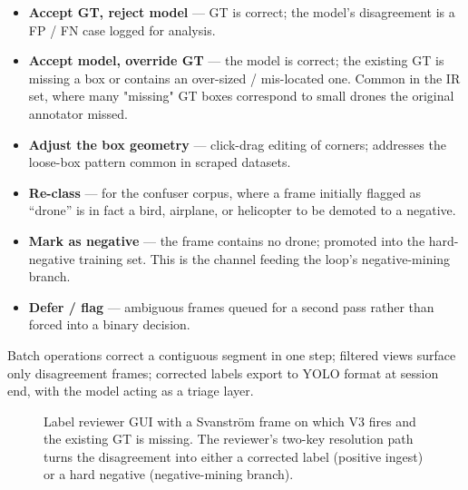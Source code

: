 \begin{itemize}
    \item \textbf{Accept GT, reject model} --- GT is correct; the model's disagreement is a FP / FN case logged for analysis.
    \item \textbf{Accept model, override GT} --- the model is correct; the existing GT is missing a box or contains an over-sized / mis-located one. Common in the IR set, where many "missing" GT boxes correspond to small drones the original annotator missed.
    \item \textbf{Adjust the box geometry} --- click-drag editing of corners; addresses the loose-box pattern common in scraped datasets.
    \item \textbf{Re-class} --- for the confuser corpus, where a frame initially flagged as ``drone'' is in fact a bird, airplane, or helicopter to be demoted to a negative.
    \item \textbf{Mark as negative} --- the frame contains no drone; promoted into the hard-negative training set. This is the channel feeding the loop's negative-mining branch.
    \item \textbf{Defer / flag} --- ambiguous frames queued for a second pass rather than forced into a binary decision.
\end{itemize}

Batch operations correct a contiguous segment in one step; filtered views surface only disagreement frames; corrected labels export to YOLO format at session end, with the model acting as a triage layer.

\begin{figure}[htbp]
    \centering
    \caption{Label reviewer GUI with a Svanstr\"om frame on which V3 fires and the existing GT is missing. The reviewer's two-key resolution path turns the disagreement into either a corrected label (positive ingest) or a hard negative (negative-mining branch).}
    \label{fig:label_reviewer}
\end{figure}

